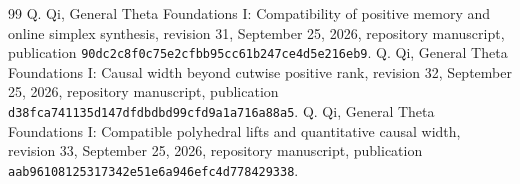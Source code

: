 \begin{thebibliography}{99}
 Q. Qi,
General Theta Foundations I: Compatibility of positive memory and online
simplex synthesis, revision 31, September 25, 2026,
repository manuscript, publication \texttt{90dc2c8f0c75e2cfbb95cc61b247ce4d5e216eb9}.
 Q. Qi,
General Theta Foundations I: Causal width beyond cutwise positive rank,
revision 32, September 25, 2026, repository manuscript, publication
\texttt{d38fca741135d147dfdbdbd99cfd9a1a716a88a5}.
 Q. Qi,
General Theta Foundations I: Compatible polyhedral lifts and quantitative
causal width, revision 33, September 25, 2026, repository manuscript,
publication \texttt{aab96108125317342e51e6a946efc4d778429338}.
\end{thebibliography}
